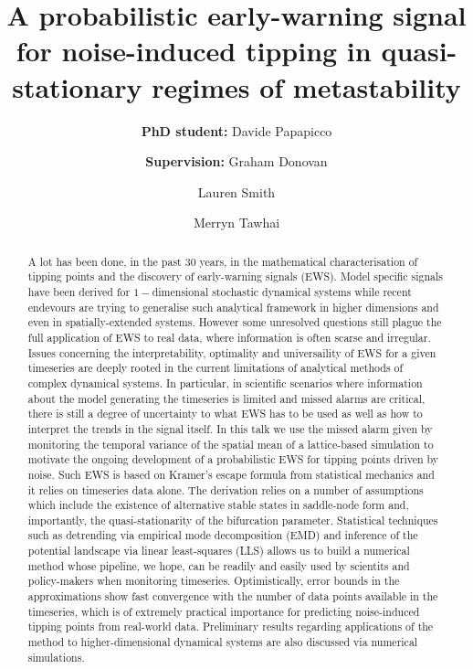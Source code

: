 \documentclass[dvipsnames, table, 11pt]{article}
\begin{document}
     \title{A probabilistic early-warning signal for noise-induced tipping in quasi-stationary regimes of metastability}

     \author[*]{\textbf{PhD student:} Davide Papapicco}
     \author[*]{\authorcr \textbf{Supervision:} Graham Donovan}
     \author[*]{Lauren Smith}
     \author[$\dagger$]{Merryn Tawhai}

 
     \date{}

     \maketitle

     \begin{abstract}
             A lot has been done, in the past $30$ years, in the mathematical characterisation of tipping points and the discovery of early-warning signals (EWS).
             Model specific signals have been derived for $1-$dimensional stochastic dynamical systems while recent endevours are trying to generalise such analytical framework in higher dimensions and even in spatially-extended systems.
             However some unresolved questions still plague the full application of EWS to real data, where information is often scarse and irregular.
             Issues concerning the interpretability, optimality and universaility of EWS for a given timeseries are deeply rooted in the current limitations of analytical methods of complex dynamical systems.
             In particular, in scientific scenarios where information about the model generating the timeseries is limited and missed alarms are critical, there is still a degree of uncertainty to what EWS has to be used as well as how to interpret the trends in the signal itself.
             In this talk we use the missed alarm given by monitoring the temporal variance of the spatial mean of a lattice-based simulation to motivate the ongoing development of a probabilistic EWS for tipping points driven by noise.
             Such EWS is based on Kramer's escape formula from statistical mechanics and it relies on timeseries data alone.
             The derivation relies on a number of assumptions which include the existence of alternative stable states in saddle-node form and, importantly, the quasi-stationarity of the bifurcation parameter.
             Statistical techniques such as detrending via empirical mode decomposition (EMD) and inference of the potential landscape via linear least-squares (LLS) allows us to build a numerical method whose pipeline, we hope, can be readily and easily used by scientits and policy-makers when monitoring timeseries.
             Optimistically, error bounds in the approximations show fast convergence with the number of data points available in the timeseries, which is of extremely practical importance for predicting noise-induced tipping points from real-world data.
             Preliminary results regarding applications of the method to higher-dimensional dynamical systems are also discussed via numerical simulations.
     \end{abstract}
\end{document}
